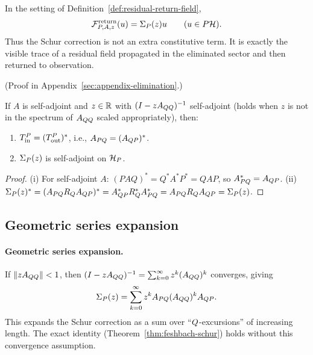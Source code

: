 \begin{proposition}
\label{prop:return-residual-is-schur}
In the setting of Definition~\ref{def:residual-return-field},
\[
\mathcal F^{\mathrm{return}}_{P,A,z}(u)=\Sigma_{P}(z)u
\qquad (u\in P\mathcal{H}).
\]
Thus the Schur correction is not an extra constitutive term. It is exactly the
visible trace of a residual field propagated in the eliminated sector and then
returned to observation.
\end{proposition}

(Proof in Appendix~\ref{sec:appendix-elimination}.)

\begin{corollary}
\label{cor:self-adjoint-sigma}
If $A$ is self-adjoint and $z \in \mathbb{R}$ with $(I - zA_{QQ})^{-1}$ self-adjoint (holds when $z$ is not in the spectrum of $A_{QQ}$ scaled appropriately), then:
\begin{enumerate}[label=(\roman*)]
\item $T_{\mathrm{in}}^{P} = (T_{\mathrm{out}}^{P})^*$, i.e., $A_{PQ} = (A_{QP})^*$.
\item $\Sigma_{P}(z)$ is self-adjoint on $\mathcal{H}_P$.
\end{enumerate}
\end{corollary}

\begin{proof}
(i) For self-adjoint $A$: $(PAQ)^* = Q^* A^* P^* = QAP$, so $A_{PQ}^* = A_{QP}$.
(ii) $\Sigma_{P}(z)^* = (A_{PQ} R_Q A_{QP})^* = A_{QP}^* R_Q^* A_{PQ}^* = A_{PQ} R_Q A_{QP} = \Sigma_{P}(z)$.
\end{proof}

\subsection{Geometric series expansion}

\paragraph{Geometric series expansion.}
\label{rem:geometric-expansion}
If $\|z A_{QQ}\| < 1$, then $(I - z A_{QQ})^{-1} = \sum_{k=0}^\infty z^k (A_{QQ})^k$ converges, giving
\[
\Sigma_{P}(z) = \sum_{k=0}^\infty z^k A_{PQ} (A_{QQ})^k A_{QP}.
\]
This expands the Schur correction as a sum over ``$Q$-excursions'' of increasing length.
The exact identity (Theorem~\ref{thm:feshbach-schur}) holds without this convergence assumption.

